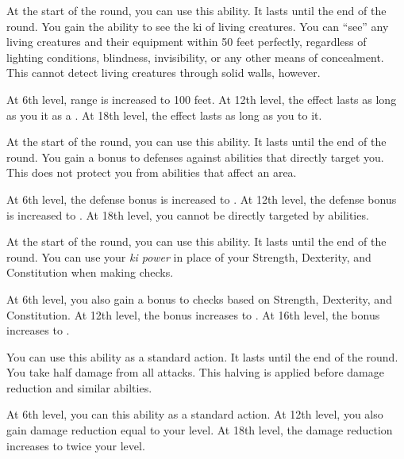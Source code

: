 {            
            At the start of the round, you can use this ability.
            It lasts until the end of the round.
            You gain the ability to see the ki of living creatures.
            You can ``see'' any living creatures and their equipment within 50 feet perfectly, regardless of lighting conditions, blindness, invisibility, or any other means of concealment.
            This cannot detect living creatures through solid walls, however.
            \par At 6th level, range is increased to 100 feet.
            At 12th level, the effect lasts as long as you  it as a .
            At 18th level, the effect lasts as long as you  to it.

            At the start of the round, you can use this ability.
            It lasts until the end of the round.
            You gain a  bonus to defenses against  abilities that directly target you.
            This does not protect you from abilities that affect an area.
            \par At 6th level, the defense bonus is increased to .
            At 12th level, the defense bonus is increased to .
            At 18th level, you cannot be directly targeted by  abilities.

            At the start of the round, you can use this ability.
            It lasts until the end of the round.
            You can use your \textit{ki power} in place of your Strength, Dexterity, and Constitution when making checks.
            \par At 6th level, you also gain a  bonus to checks based on Strength, Dexterity, and Constitution.
            At 12th level, the bonus increases to .
            At 16th level, the bonus increases to .

            You can use this ability as a standard action.
            It lasts until the end of the round.
            You take half damage from all attacks.
            This halving is applied before damage reduction and similar abilties.
            \par At 6th level, you can  this ability as a standard action.
            At 12th level, you also gain damage reduction equal to your level.
            At 18th level, the damage reduction increases to twice your level.
        }

